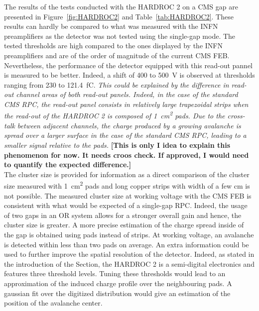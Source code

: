 	The results of the tests conducted with the HARDROC 2 on a CMS gap are presented in Figure~\ref{fig:HARDROC2} and Table~\ref{tab:HARDROC2}. These results can hardly be compared to what was measured with the INFN preamplifiers as the detector was not tested using the single-gap mode. The tested thresholds are high compared to the ones displayed by the INFN preamplifiers and are of the order of magnitude of the current CMS FEB. Nevertheless, the performance of the detector equipped with this read-out pannel is measured to be better. Indeed, a shift of 400 to \SI{500}{V} is observed at thresholds ranging from 230 to \SI{121.4}{fC}. \textit{This could be explained by the difference in read-out channel areas of both read-out panels. Indeed, in the case of the standard CMS RPC, the read-out panel consists in relatively large trapezoidal strips when the read-out of the HARDROC 2 is composed of \SI{1}{cm^2} pads. Due to the cross-talk between adjacent channels, the charge produced by a growing avalanche is spread over a larger surface in the case of the standard CMS RPC, leading to a smaller signal relative to the pads.} \textbf{[This is only I idea to explain this phenomenon for now. It needs croos check. If approved, I would need to quantify the expected difference.]}\\
	The cluster size is provided for information as a direct comparison of the cluster size measured with \SI{1}{cm^2} pads and long copper strips with width of a few \si{cm} is not possible. The measured cluster size at working voltage with the CMS FEB is consistent with what would be expected of a single-gap RPC. Indeed, the usage of two gaps in an OR system allows for a stronger overall gain and hence, the cluster size is greater. A more precise estimation of the charge spread inside of the gap is obtained using pads instead of strips. At working voltage, an avalanche is detected within less than two pads on average. An extra information could be used to further improve the spatial resolution of the detector. Indeed, as stated in the introduction  of the Section, the HARDROC 2 is a semi-digital electronics and features three threshold levels. Tuning these thresholds would lead to an approximation of the induced charge profile over the neighbouring pads. A gaussian fit over the digitized distribution would give an estimation of the position of the avalanche center.
	
